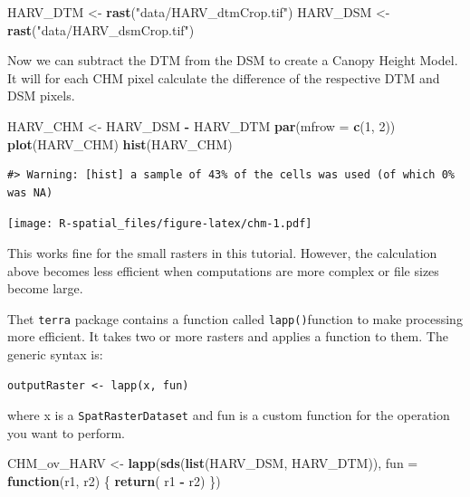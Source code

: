 \documentclass[
]{book}
\newenvironment{Shaded}{\begin{snugshade}}{\end{snugshade}}
\newcommand{\AttributeTok}[1]{\textcolor[rgb]{0.13,0.29,0.53}{#1}}
\newcommand{\ControlFlowTok}[1]{\textcolor[rgb]{0.13,0.29,0.53}{\textbf{#1}}}
\newcommand{\DecValTok}[1]{\textcolor[rgb]{0.00,0.00,0.81}{#1}}
\newcommand{\FunctionTok}[1]{\textcolor[rgb]{0.13,0.29,0.53}{\textbf{#1}}}
\newcommand{\NormalTok}[1]{#1}
\newcommand{\OtherTok}[1]{\textcolor[rgb]{0.56,0.35,0.01}{#1}}
\newcommand{\SpecialCharTok}[1]{\textcolor[rgb]{0.81,0.36,0.00}{\textbf{#1}}}
\newcommand{\StringTok}[1]{\textcolor[rgb]{0.31,0.60,0.02}{#1}}
\begin{document}
\begin{Shaded}
\begin{Highlighting}[]
\NormalTok{HARV\_DTM }\OtherTok{\textless{}{-}} \FunctionTok{rast}\NormalTok{(}\StringTok{"data/HARV\_dtmCrop.tif"}\NormalTok{)}
\NormalTok{HARV\_DSM }\OtherTok{\textless{}{-}} \FunctionTok{rast}\NormalTok{(}\StringTok{"data/HARV\_dsmCrop.tif"}\NormalTok{)}
\end{Highlighting}
\end{Shaded}

Now we can subtract the DTM from the DSM to create a Canopy Height Model. It will for each CHM pixel calculate the difference of the respective DTM and DSM pixels.

\begin{Shaded}
\begin{Highlighting}[]
\NormalTok{HARV\_CHM }\OtherTok{\textless{}{-}}\NormalTok{ HARV\_DSM }\SpecialCharTok{{-}}\NormalTok{ HARV\_DTM}
\FunctionTok{par}\NormalTok{(}\AttributeTok{mfrow =} \FunctionTok{c}\NormalTok{(}\DecValTok{1}\NormalTok{, }\DecValTok{2}\NormalTok{))}
\FunctionTok{plot}\NormalTok{(HARV\_CHM)}
\FunctionTok{hist}\NormalTok{(HARV\_CHM)}
\end{Highlighting}
\end{Shaded}

\begin{verbatim}
#> Warning: [hist] a sample of 43% of the cells was used (of which 0% was NA)
\end{verbatim}

\texttt{[image: R-spatial\_files/figure-latex/chm-1.pdf]}

This works fine for the small rasters in this tutorial. However, the calculation above becomes less efficient when computations are more complex or file sizes become large.

Thet \texttt{terra} package contains a function called \texttt{lapp()}function to make processing more efficient. It takes two or more rasters and applies a function to them. The generic syntax is:

\begin{verbatim}
outputRaster <- lapp(x, fun)
\end{verbatim}

where x is a \texttt{SpatRasterDataset} and fun is a custom function for the operation you want to perform.

\begin{Shaded}
\begin{Highlighting}[]
\NormalTok{CHM\_ov\_HARV }\OtherTok{\textless{}{-}} \FunctionTok{lapp}\NormalTok{(}\FunctionTok{sds}\NormalTok{(}\FunctionTok{list}\NormalTok{(HARV\_DSM, HARV\_DTM)), }
                    \AttributeTok{fun =} \ControlFlowTok{function}\NormalTok{(r1, r2) \{ }
                      \FunctionTok{return}\NormalTok{( r1 }\SpecialCharTok{{-}}\NormalTok{ r2) }
\NormalTok{                      \})}
\end{Highlighting}
\end{Shaded}
\end{document}
